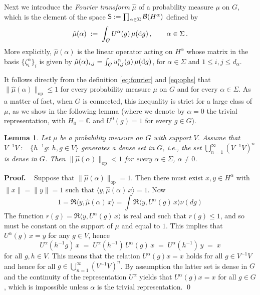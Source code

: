 \documentclass[a4paper,reqno,11pt]{amsart}
\numberwithin{equation}{section}
\newtheorem{lemma}[theorem]{Lemma}
\newcommand{\cB}{{\ensuremath{\mathcal B}} }
\newcommand{\ga}{\alpha}
\newcommand{\dd}{\text{\rm d}}             %
\DeclareMathOperator*{\union}{\bigcup}       %
\newcommand{\C}{\mathbb{C}}
\def\proof{\noindent\textbf{Proof.} \ }
\begin{document}
Next we introduce the {\sl Fourier transform} $\hat\mu$ of a
probability measure $\mu$ on $G$, which is the element of the space
${\sf S} := \prod_{\alpha \in \Sigma} \cB(H^\alpha)$ defined by
\begin{equation} \label{eq:fourier}
	\hat \mu(\alpha) \;:=\; \int_G U^{\alpha}(g) \,\mu(\dd g) \,, \qquad
\alpha \in \Sigma\,.
\end{equation}
More explicitly, $\hat \mu(\alpha)$ is the linear operator
acting on $H^\alpha$ whose matrix
in the basis $\{\zeta^\alpha_i\}_{i}$ is given by
$\hat \mu(\alpha)_{i,j} = \int_G u^\alpha_{i,j}(g)\, \mu(\dd g)$,
for $\alpha \in \Sigma$ and $1 \le i,j \le d_\alpha$.


It follows directly from the definition \eqref{eq:fourier} and \eqref{eq:ophs}
that $\|\hat \mu(\alpha)\|_{\text{op}} \le 1$ for every
probability measure $\mu$ on $G$ and for every
$\alpha \in \Sigma$. As a matter of fact, when $G$ is connected, this
inequality is strict for a large class of $\mu$,
as we show in the following lemma (where we denote by
$\alpha = 0$ the trivial representation, with
$H_0 = \C$ and $U^0(g) = 1$ for every $g \in G$).

\smallskip
\begin{lemma} \label{lem:1}
Let $\mu$ be a probability measure on $G$ with support $V$.
Assume that $V^{-1} V := \{h^{-1}g:\, h,g \in V\}$ generates a dense set in $G$,
{\sl i.e.}, the set $\union_{n=1}^\infty (V^{-1} V)^n$ is dense in $G$.
Then $\|\hat \mu(\alpha)\|_{\text{op}} < 1$ for
every $\alpha \in \Sigma$, $\alpha \ne 0$.
\end{lemma}
\smallskip



\proof
Suppose that $\|\hat\mu(\alpha)\|_{\text{op}} = 1$. Then there must
exist $x,y \in H^\alpha$ with $\|x\| = \|y\| = 1$
such that $ \langle y, \hat \mu(\alpha)\, x \rangle  = 1$.
Now
\begin{equation}
1= \Re \langle y , \hat \mu(\alpha) \,x \rangle
= \int \Re \langle y,U^\alpha(g)\, x \rangle \nu(dg)
\end{equation}
The function $r(g) = \Re \langle y,U^\alpha(g)\,x\rangle$ is real and such that
$r(g)\le 1$, and so must be constant on the support of $\mu$ and equal to $1$.
This implies that $U^\alpha(g)\, x = y$ for any $g\in V$, hence
\begin{equation}
	U^\ga(h^{-1}g)\, x \;=\; U^\ga(h^{-1})\, U^\ga(g)\, x
	\;=\; U^\ga(h^{-1})\, y \;=\; x
\end{equation}
for all $g,h \in V$. This means that the relation $U^\ga(g) x = x$
holds for all $g \in V^{-1}V$ and hence for all $g \in \union_{n=1}^\infty
(V^{-1} V)^n$. By assumption the latter set is dense in $G$ and the continuity
of the representation $U^\ga$ yields that $U^\ga(g) x = x$ for all $g \in G$,
which is impossible unless $\ga$ is the trivial representation.
\qed
\medskip
\end{document}
